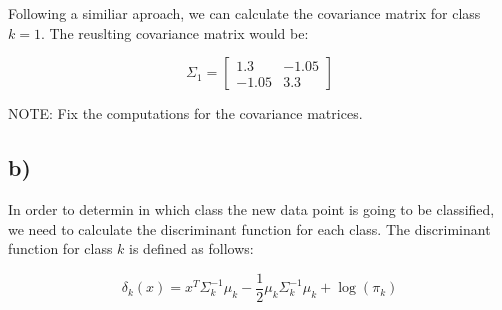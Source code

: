 \documentclass{article}
\begin{document}
Following a similiar aproach, we can calculate the covariance matrix for class $k = 1$. The reuslting covariance matrix would be:

\begin{equation}
  \Sigma_1 = \begin{bmatrix}
    1.3 & -1.05 \\
    -1.05 & 3.3
  \end{bmatrix}
\end{equation}

NOTE: Fix the computations for the covariance matrices.

\subsection{b)}
In order to determin in which class the new data point is going to be classified, we need to calculate the discriminant function for each class. The discriminant function for class $k$ is defined as follows:

\begin{equation}
  \delta_k(x) = x^T \Sigma_k^{-1}\mu_k - \frac{1}{2}\mu_k \Sigma_k^{-1}\mu_k + \log(\pi_k)
\end{equation}

\clearpage

% 
%  

\end{document}
